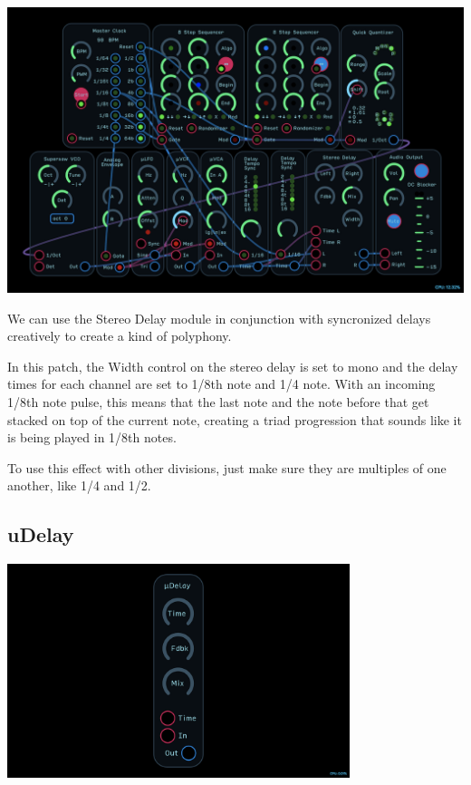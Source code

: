 \documentclass[11pt]{book}
\begin{document}
\begin{multicols*}{2}
\begin{center}
\includegraphics[width=0.95\linewidth]{stereo-delay-fig3.png}
\end{center}

We can use the Stereo Delay module in conjunction with syncronized delays creatively to create a kind of polyphony.

In this patch, the Width control on the stereo delay is set to mono and the delay times for each channel are set to 1/8th note and 1/4 note. With an incoming 1/8th note pulse, this means that the last note and the note before that get stacked on top of the current note, creating a triad progression that sounds like it is being played in 1/8th notes.

To use this effect with other divisions, just make sure they are multiples of one another, like 1/4 and 1/2.

\end{multicols*}

\pagebreak


\subsection{uDelay}

\begin{center}
\includegraphics[width=0.75\textwidth]{udelay.png}
\end{center}
\end{document}
